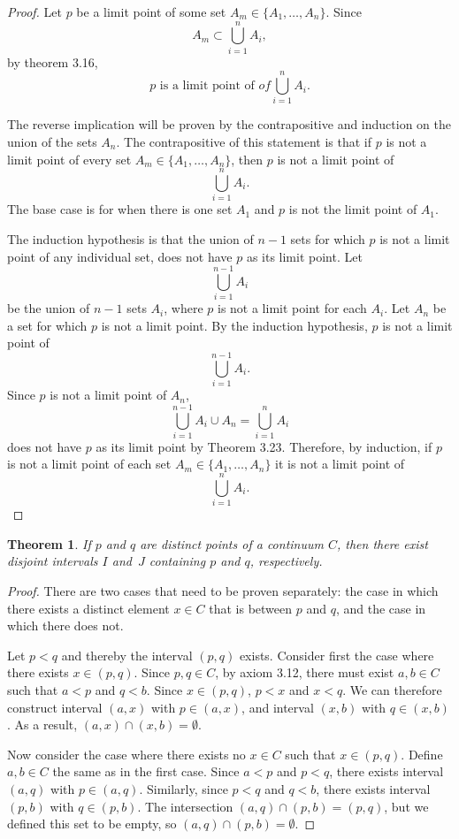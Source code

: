 \documentclass{amsart}
\newtheorem{theorem}{Theorem}
\newcommand{\1}{\mathds{1}}
\numberwithin{equation}{section}
\numberwithin{theorem}{section}
\begin{document}
\begin{proof}
	Let $p$ be a limit point of some set $A_m\in\{A_1, \dotsc, A_n\}$. Since $$A_m\subset \bigcup_{i=1}^n A_i,$$ by theorem 3.16, $$p \text{ is a limit point of } of \bigcup_{i=1}^n A_i.$$ 
	
	The reverse implication will be proven by the contrapositive and induction on the union of the sets $A_n$. The contrapositive of this statement is that if $p$ is not a limit point of every set $A_m\in\{A_1, \dotsc, A_n\}$, then $p$ is not a limit point of $$\bigcup_{i=1}^n A_i.$$ The base case is for when there is one set $A_1$ and $p$ is not the limit point of $A_1$.


	The induction hypothesis is that the union of $n-1$ sets for which $p$ is not a limit point of any individual set, does not have $p$ as its limit point. Let $$\bigcup_{i=1}^{n-1} A_i$$ be the union of $n-1$ sets $A_i$, where $p$ is not a limit point for each $A_i$. Let $A_n$ be a set for which $p$ is not a limit point. By the induction hypothesis, $p$ is not a limit point of $$\bigcup_{i=1}^{n-1} A_i.$$ Since $p$ is not a limit point of $A_n$, $$\bigcup_{i=1}^{n-1} A_i \cup A_{n} = \bigcup_{i=1}^n A_i$$ does not have $p$ as its limit point by Theorem 3.23. Therefore, by induction, if $p$ is not a limit point of each set $A_m\in\{A_1, \dotsc, A_n\}$ it is not a limit point of $$\bigcup_{i=1}^{n} A_i.$$
\end{proof}	

\begin{theorem}  If $p$ and $q$ are distinct points of a continuum $C$, then there exist disjoint intervals $I$ and~$J$ containing $p$ and $q$, respectively.
\end{theorem}

\begin{proof}
	There are two cases that need to be proven separately: the case in which there exists a distinct element $x\in C$ that is between $p$ and $q$, and the case in which there does not. 
	
	Let $p<q$ and thereby the interval $(p,q)$ exists. Consider first the case where there exists $x\in (p,q)$.  Since $p,q\in C$, by axiom 3.12, there must exist $a,b\in C$ such that $a<p$ and $q<b$. Since $x\in (p,q)$, $p<x$ and $x<q$. We can therefore construct interval $(a,x)$ with $p\in (a,x)$, and interval $(x,b)$ with $q\in (x,b)$. As a result, $(a,x) \cap (x,b) = \emptyset$. 
	
	Now consider the case where there exists no $x\in C$ such that $x\in (p,q)$. Define $a,b\in C$ the same as in the first case. Since $a<p$ and
	$p<q$, there exists interval $(a,q)$ with $p\in (a,q)$. Similarly, since $p<q$ and $q<b$, there exists interval $(p,b)$ with $q\in (p,b)$. The intersection $(a,q)\cap (p,b) = (p,q)$, but we defined this set to be empty, so $(a,q)\cap (p,b) = \emptyset$.
\end{proof}
\end{document}
